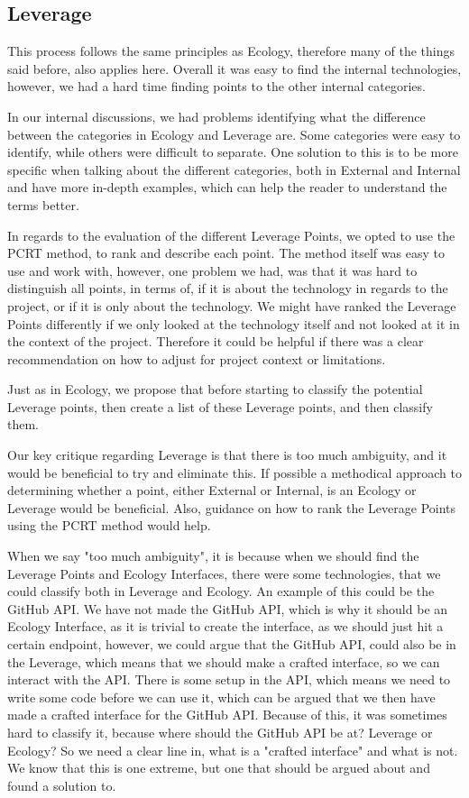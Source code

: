 \subsection{Leverage}
This process follows the same principles as Ecology, therefore many of the things said before, also applies here.
Overall it was easy to find the internal technologies, however, we had a hard time finding points to the other internal categories.

In our internal discussions, we had problems identifying what the difference between the categories in Ecology and Leverage are.
Some categories were easy to identify, while others were difficult to separate.
One solution to this is to be more specific when talking about the different categories, both in External and Internal and have more in-depth examples, which can help the reader to understand the terms better.

In regards to the evaluation of the different Leverage Points, we opted to use the PCRT method, to rank and describe each point.
The method itself was easy to use and work with, however, one problem we had, was that it was hard to distinguish all points, in terms of, if it is about the technology in regards to the project, or if it is only about the technology.
We might have ranked the Leverage Points differently if we only looked at the technology itself and not looked at it in the context of the project.
Therefore it could be helpful if there was a clear recommendation on how to adjust for project context or limitations.

Just as in Ecology, we propose that before starting to classify the potential Leverage points, then create a list of these Leverage points, and then classify them.

Our key critique regarding Leverage is that there is too much ambiguity, and it would be beneficial to try and eliminate this. 
If possible a methodical approach to determining whether a point, either External or Internal, is an Ecology or Leverage would be beneficial.
Also, guidance on how to rank the Leverage Points using the PCRT method would help.

When we say "too much ambiguity", it is because when we should find the Leverage Points and Ecology Interfaces, there were some technologies, that we could classify both in Leverage and Ecology.
An example of this could be the GitHub API.
We have not made the GitHub API, which is why it should be an Ecology Interface, as it is trivial to create the interface, as we should just hit a certain endpoint, however, we could argue that the GitHub API, could also be in the Leverage, which means that we should make a crafted interface, so we can interact with the API.
There is some setup in the API, which means we need to write some code before we can use it, which can be argued that we then have made a crafted interface for the GitHub API.
Because of this, it was sometimes hard to classify it, because where should the GitHub API be at? 
Leverage or Ecology?
So we need a clear line in, what is a "crafted interface" and what is not.
We know that this is one extreme, but one that should be argued about and found a solution to.  

